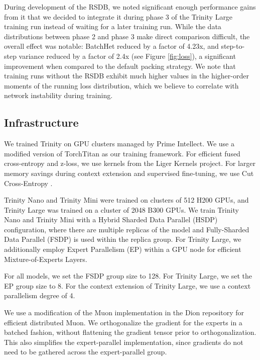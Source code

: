 \documentclass{article}
\begin{document}
During development of the RSDB, we noted significant enough performance gains from it that we decided to integrate it during phase 3 of the Trinity Large training run instead of waiting for a later training run. While the data distributions between phase 2 and phase 3 make direct comparison difficult, the overall effect was notable: BatchHet reduced by a factor of 4.23x, and step-to-step variance reduced by a factor of 2.4x (see Figure \ref{fig:loss}), a significant improvement when compared to the default packing strategy. We note that training runs without the RSDB exhibit much higher values in the higher-order moments of the running loss distribution, which we believe to correlate with network instability during training.

\subsection{Infrastructure}

We trained Trinity on GPU clusters managed by Prime Intellect. We use a modified version of TorchTitan \citep{liang2025torchtitan} as our training framework. For efficient fused cross-entropy and z-loss, we use kernels from the Liger Kernels \citep{hsu2025ligerkernel} project. For larger memory savings during context extension and supervised fine-tuning, we use Cut Cross-Entropy \citep{wijmans2025cut}.

Trinity Nano and Trinity Mini were trained on clusters of 512 H200 GPUs, and Trinity Large was trained on a cluster of 2048 B300 GPUs. We train Trinity Nano and Trinity Mini with a Hybrid Sharded Data Parallel (HSDP) configuration, where there are multiple replicas of the model and Fully-Sharded Data Parallel (FSDP) \citep{zhao2023pytorchfsdpexperiencesscaling} is used within the replica group. For Trinity Large, we additionally employ Expert Parallelism (EP) within a GPU node for efficient Mixture-of-Experts Layers. 

For all models, we set the FSDP group size to 128. For Trinity Large, we set the EP group size to 8. For the context extension of Trinity Large, we use a context parallelism degree of 4.

We use a modification of the Muon implementation in the Dion repository \citep{ahn2025dion} for efficient distributed Muon. We orthogonalize the gradient for the experts in a batched fashion, without flattening the gradient tensor prior to orthogonalization. This also simplifies the expert-parallel implementation, since gradients do not need to be gathered across the expert-parallel group.
\end{document}
